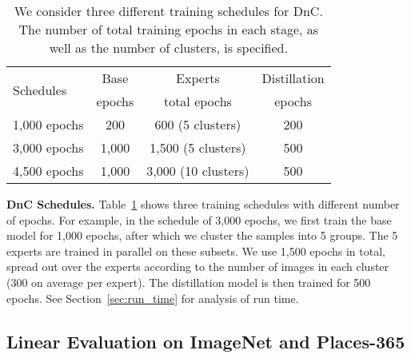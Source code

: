\documentclass[final]{cvpr}
\begin{document}
\begin{table}[ht]
\caption{We consider three different training schedules for DnC. The number of total training epochs in each stage, as well as the number of clusters, is specified.}

\label{tab:dnc_schedule}
\begin{center}
\begin{small}
\begin{tabular}{l|c|c|c}
\toprule
\multirow{2}{*}{Schedules} & Base & Experts & Distillation \\
& epochs & total epochs & epochs \\
\hline
1,000 epochs & \hspace{1ex} 200 & \hspace{1ex} 600 (5 clusters) & 200 \\
3,000 epochs & 1,000 & 1,500 (5 clusters) & 500 \\
4,500 epochs & 1,000 & \hspace{1ex}3,000 (10 clusters) & 500 \\
\bottomrule
\end{tabular}
\end{small}
\end{center}
\vspace{-10pt}
\end{table}



\noindent \textbf{DnC Schedules.} 
Table~\ref{tab:dnc_schedule} shows three training schedules with different number of epochs. For example, in the schedule of 3,000 epochs, we first train the base model for 1,000 epochs, after which we cluster the samples into 5 groups. The 5 experts are trained in parallel on these subsets. We use 1,500 epochs in total, spread out over the experts according to the number of images in each cluster (300 on average per expert). The distillation model is then trained for 500 epochs. 
See Section~\ref{sec:run_time} for analysis of run time.

\subsection{Linear Evaluation on ImageNet and Places-365}
\end{document}
